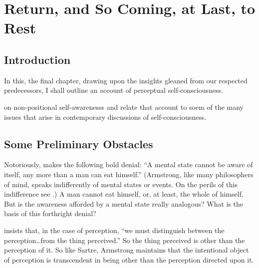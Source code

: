 \chapter{Return, and So Coming, at Last, to Rest} %
\label{cha:return}

\section{Introduction} %
\label{introduction}

In this, the final chapter, drawing upon the insights gleaned from our respected predecessors, I shall outline an account of perceptual self-consciousness.

on non-positional self-awarenesss and relate that account to soem of the many issues that arise in contemporary discussions of self-consciousness.


\section{Some Preliminary Obstacles} %
\label{some_preliminary_obstacles}

Notoriously, \citet[324]{Armstrong:1968ns} makes the following bold denial: ``A mental state cannot be aware of itself, any more than a man can eat himself.'' (Armstrong, like many philosophers of mind, speaks indifferently of mental states or events. On the perils of this indifference see \citealt{Steward:1997aa}.) A man cannot eat himself, or, at least, the whole of himself. But is the awareness afforded by a mental state really analogous? What is the basis of this forthright denial?

\citet[324]{Armstrong:1968ns} insists that, in the case of perception, ``we must distinguish between the perception\ldots from the thing perceived.'' So the thing perceived is other than the perception of it. So like Sartre, Armstrong maintains that the intentional object of perception is transcendent in being other than the perception directed upon it.

